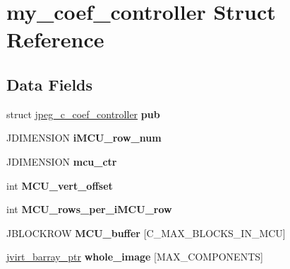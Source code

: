 \hypertarget{structmy__coef__controller}{}\section{my\+\_\+coef\+\_\+controller Struct Reference}
\label{structmy__coef__controller}
\subsection*{Data Fields}
\begin{DoxyCompactItemize}
\item 
\mbox{\label{structmy__coef__controller_a863e29c3cfa0f539776ff2c39149e35d}} 
struct \hyperlink{structjpeg__c__coef__controller}{jpeg\+\_\+c\+\_\+coef\+\_\+controller} {\bfseries pub}
\item 
\mbox{\label{structmy__coef__controller_aa26a1f31ab8ed9a00b9dea025a549813}} 
J\+D\+I\+M\+E\+N\+S\+I\+ON {\bfseries i\+M\+C\+U\+\_\+row\+\_\+num}
\item 
\mbox{\label{structmy__coef__controller_ab3fdd9a581d6be5ca63cded13d102725}} 
J\+D\+I\+M\+E\+N\+S\+I\+ON {\bfseries mcu\+\_\+ctr}
\item 
\mbox{\label{structmy__coef__controller_ad7f07d608df47865a39b0c0fdf068fe3}} 
int {\bfseries M\+C\+U\+\_\+vert\+\_\+offset}
\item 
\mbox{\label{structmy__coef__controller_ad0dd24cd5dee673c7b02edb516591525}} 
int {\bfseries M\+C\+U\+\_\+rows\+\_\+per\+\_\+i\+M\+C\+U\+\_\+row}
\item 
\mbox{\label{structmy__coef__controller_a9bee35cd2db613bc5f0cc98269cfb9af}} 
J\+B\+L\+O\+C\+K\+R\+OW {\bfseries M\+C\+U\+\_\+buffer} \mbox{[}C\+\_\+\+M\+A\+X\+\_\+\+B\+L\+O\+C\+K\+S\+\_\+\+I\+N\+\_\+\+M\+CU\mbox{]}
\item 
\mbox{\label{structmy__coef__controller_a7dcdf6da78293323f62d634a48316bee}} 
\hyperlink{structjvirt__barray__control}{jvirt\+\_\+barray\+\_\+ptr} {\bfseries whole\+\_\+image} \mbox{[}M\+A\+X\+\_\+\+C\+O\+M\+P\+O\+N\+E\+N\+TS\mbox{]}

\end{DoxyCompactItemize}
